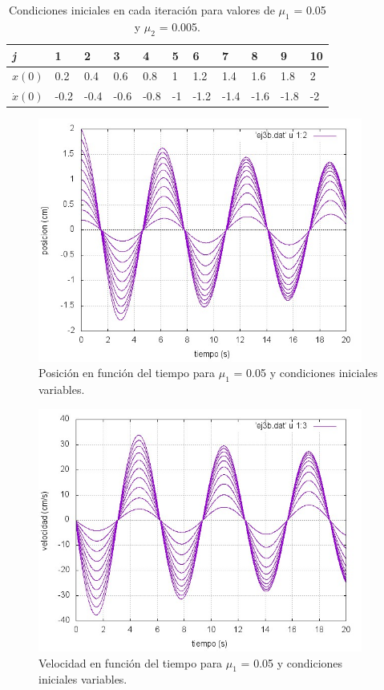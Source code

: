 \documentclass[a4paper,12pt]{article}
\begin{document}
\begin{itemize}
\begin{table}[b]
	\centering
    \begin{tabular}{| l | l | l | l | l | l | l | l | l | l |p{1cm}|}
    \hline
    \textit{j} & 1 & 2 & 3 & 4 & 5 & 6 & 7 & 8 & 9 & 10 \\ \hline
    $x(0)$ & 0.2 & 0.4 & 0.6 & 0.8 & 1 & 1.2 & 1.4 & 1.6 & 1.8 & 2 \\ \hline
    $\dot{x}(0)$ & -0.2 & -0.4 & -0.6 & -0.8 & -1 & -1.2 & -1.4 & -1.6 & -1.8 & -2 \\
    \hline
    \end{tabular}
    \caption{Condiciones iniciales en cada iteraci\'on para valores de $\mu_1$ = 0.05 y $\mu_2$ = 0.005.}
    \label{table:2}
\end{table}



\begin{figure}[H]
\begin{center}
\includegraphics[height=8cm]{grafico_ej3b_xVSt.jpg}
\caption[width=5cm]{Posici\'on en funci\'on del tiempo para $\mu_1$ = 0.05 y condiciones iniciales variables.}
\end{center}
\end{figure}

\begin{figure}[H]
\begin{center}
\includegraphics[height=8cm]{grafico_ej3b_vVSt.jpg}
\caption[width=5cm]{Velocidad en funci\'on del tiempo para $\mu_1$ = 0.05 y condiciones iniciales variables.}
\end{center}
\end{figure}


\end{itemize}
\end{document}
